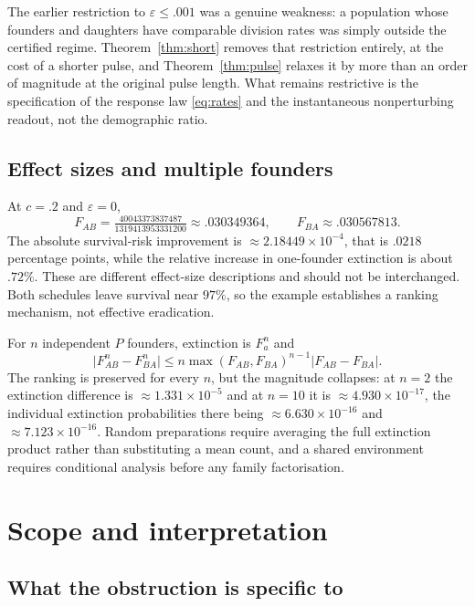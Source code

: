 \documentclass[11pt]{article}
\theoremstyle{plain}
\theoremstyle{definition}
\theoremstyle{remark}
\newcommand{\eps}{\varepsilon}
\begin{document}
The earlier restriction to $\eps\le.001$ was a genuine weakness: a population
whose founders and daughters have comparable division rates was simply outside
the certified regime. Theorem~\ref{thm:short} removes that restriction
entirely, at the cost of a shorter pulse, and Theorem~\ref{thm:pulse} relaxes
it by more than an order of magnitude at the original pulse length. What
remains restrictive is the specification of the response law \eqref{eq:rates}
and the instantaneous nonperturbing readout, not the demographic ratio.

\subsection{Effect sizes and multiple founders}

At $c=.2$ and $\eps=0$,
\[
 F_{AB}=\tfrac{40043373837487}{1319413953331200}\approx.030349364,
 \qquad
 F_{BA}\approx.030567813 .
\]
The absolute survival-risk improvement is $\approx2.18449\times10^{-4}$, that
is $.0218$ percentage points, while the relative increase in one-founder
extinction is about $.72\%$. These are different effect-size descriptions and
should not be interchanged. Both schedules leave survival near $97\%$, so the
example establishes a ranking mechanism, not effective eradication.

For $n$ independent $P$ founders, extinction is $F_a^n$ and
\begin{equation}\label{eq:founders}
 \bigl|F_{AB}^n-F_{BA}^n\bigr|
 \le n\max(F_{AB},F_{BA})^{n-1}\bigl|F_{AB}-F_{BA}\bigr| .
\end{equation}
The ranking is preserved for every $n$, but the magnitude collapses: at $n=2$
the extinction difference is $\approx1.331\times10^{-5}$ and at $n=10$ it is
$\approx4.930\times10^{-17}$, the individual extinction probabilities there
being $\approx6.630\times10^{-16}$ and $\approx7.123\times10^{-16}$. Random
preparations require averaging the full extinction product rather than
substituting a mean count, and a shared environment requires conditional
analysis before any family factorisation.

\section{Scope and interpretation}\label{sec:scope}

\subsection{What the obstruction is specific to}
\end{document}
